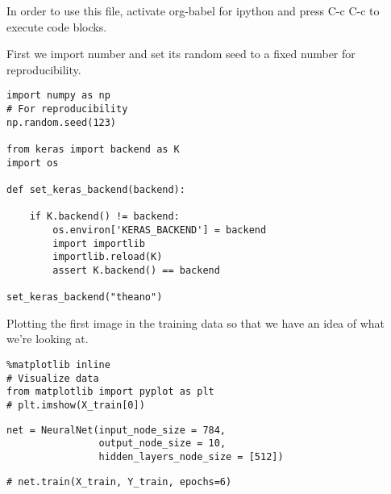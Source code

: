 \documentclass[11pt]{article}
\author{grokkingStuff}
\date{\today}
\title{}
\begin{document}
\tableofcontents

In order to use this file, activate org-babel for ipython and press C-c C-c to execute code blocks.


First we import number and set its random seed to a fixed number for reproducibility.
\begin{verbatim}
import numpy as np
# For reproducibility
np.random.seed(123)

from keras import backend as K
import os

def set_keras_backend(backend):

    if K.backend() != backend:
        os.environ['KERAS_BACKEND'] = backend
        import importlib
        importlib.reload(K)
        assert K.backend() == backend

set_keras_backend("theano")
\end{verbatim}

Plotting the first image in the training data so that we have an idea of what we're looking at.
\begin{verbatim}
%matplotlib inline
# Visualize data
from matplotlib import pyplot as plt
# plt.imshow(X_train[0])
\end{verbatim}


\begin{verbatim}
net = NeuralNet(input_node_size = 784,
                output_node_size = 10,
                hidden_layers_node_size = [512])
\end{verbatim}

\begin{verbatim}
# net.train(X_train, Y_train, epochs=6)
\end{verbatim}
\end{document}
